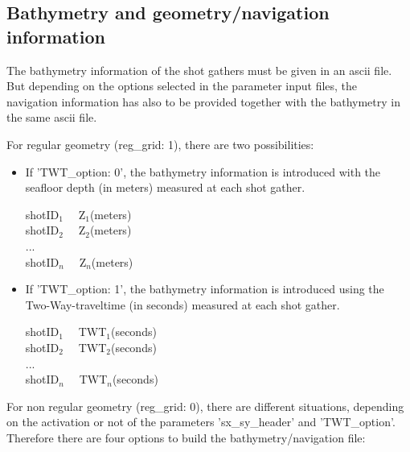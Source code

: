 \documentclass[11pt, oneside]{article}   	%
\begin{document}
\subsection{Bathymetry and geometry/navigation information}\label{sec4b}
The bathymetry information of the shot gathers must be given in an ascii file. But depending on the options selected in the parameter input files, the navigation information has also to be provided together with the bathymetry in the same ascii file. 

For regular geometry (reg\_grid: 1), there are two possibilities:
\begin{itemize}

\item If 'TWT\_option: 0', the bathymetry information is introduced with the seafloor depth (in meters) measured at each shot gather.

shotID$_1$	~~Z$_1$(meters) \\
shotID$_2$	~~Z$_2$(meters) \\
... \\
shotID$_n$	~~Z$_n$(meters) \\

\item If 'TWT\_option: 1', the bathymetry information is introduced using the Two-Way-traveltime (in seconds) measured at each shot gather. 

shotID$_1$	~~TWT$_1$(seconds) \\
shotID$_2$	~~TWT$_2$(seconds) \\
... \\
shotID$_n$	~~TWT$_n$(seconds) \\
\end{itemize}

For non regular geometry  (reg\_grid: 0), there are different situations, depending on the activation or not of the parameters 'sx\_sy\_header' and 'TWT\_option'. Therefore there are four options to build the bathymetry/navigation file:
\end{document}
